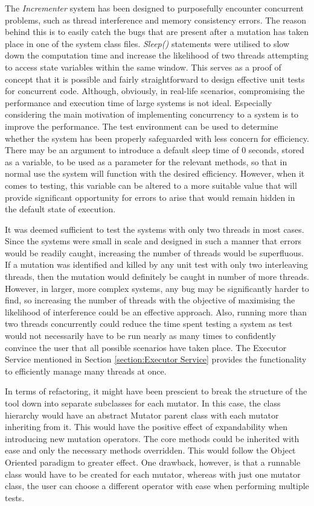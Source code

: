 \documentclass[a4paper,12pt]{article}
\begin{document}
The \textit{Incrementer} system has been designed to purposefully encounter concurrent problems, such as thread interference and memory consistency errors. The reason behind this is to easily catch the bugs that are present after a mutation has taken place in one of the system class files. \textit{Sleep()} statements were utilised to slow down the computation time and increase the likelihood of two threads attempting to access state variables within the same window. This serves as a proof of concept that it is possible and fairly straightforward to design effective unit tests for concurrent code. Although, obviously, in real-life scenarios, compromising the performance and execution time of large systems is not ideal. Especially considering the main motivation of implementing concurrency to a system is to improve the performance. The test environment can be used to determine whether the system has been properly safeguarded with less concern for efficiency. There may be an argument to introduce a default sleep time of 0 seconds, stored as a variable, to be used as a parameter for the relevant methods, so that in normal use the system will function with the desired efficiency. However, when it comes to testing, this variable can be altered to a more suitable value that will provide significant opportunity for errors to arise that would remain hidden in the default state of execution. 

It was deemed sufficient to test the systems with only two threads in most cases. Since the systems were small in scale and designed in such a manner that errors would be readily caught, increasing the number of threads would be superfluous. If a mutation was identified and killed by any unit test with only two interleaving threads, then the mutation would definitely be caught in number of more threads. However, in larger, more complex systems, any bug may be significantly harder to find, so increasing the number of threads with the objective of maximising the likelihood of interference could be an effective approach. Also, running more than two threads concurrently could reduce the time spent testing a system as test would not necessarily have to be run nearly as many times to confidently convince the user that all possible scenarios have taken place. The Executor Service mentioned in Section \ref{section:Executor Service} provides the functionality to efficiently manage many threads at once.  

In terms of refactoring, it might have been prescient to break the structure of the tool down into separate subclasses for each mutator. In this case, the class hierarchy would have an abstract Mutator parent class with each mutator inheriting from it. This would have the positive effect of expandability when introducing new mutation operators. The core methods could be inherited with ease and only the necessary methods overridden. This would follow the Object Oriented paradigm to greater effect. One drawback, however, is that a runnable class would have to be created for each mutator, whereas with just one mutator class, the user can choose a different operator with ease when performing multiple tests.
\end{document}
